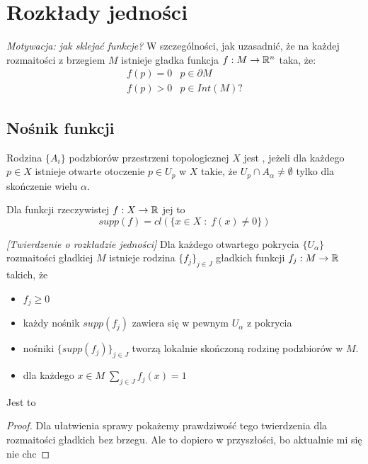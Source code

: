 \section{Rozkłady jedności}
\emph{Motywacja: jak sklejać funkcje?} W szczególności, jak uzasadnić, że na każdej rozmaitości z brzegiem $M$ istnieje gładka funkcja $f:M\to\mathbb{R}^n$ taka, że:
$$
\begin{matrix}
f(p)=0 & p\in\partial M\\
f(p)>0 & p\in Int(M)?
\end{matrix}
$$

\subsection{Nośnik funkcji}

\begin{definition}
Rodzina $\{A_i\}$ podzbiorów przestrzeni topologicznej $X$ jest , jeżeli dla każdego $p\in X$ istnieje otwarte otoczenie $p\in U_p$ w $X$ takie, że $U_p\cap A_\alpha\neq\emptyset$ tylko dla skończenie wielu $\alpha$.
\end{definition}

\begin{definition}
Dla funkcji rzeczywistej $f:X\to\mathbb{R}$ jej  to
$$supp(f)=cl(\{x\in X\;:\;f(x)\neq0\})$$
\end{definition}


\begin{theorem}
\emph{[Twierdzenie o rozkładzie jedności]} Dla każdego otwartego pokrycia $\{U_\alpha\}$ rozmaitości gładkiej $M$ istnieje rodzina $\{f_j\}_{j\in J}$ gładkich funkcji $f_j:M\to\mathbb{R}$ takich, że
\begin{itemize}
    \item $f_j\geq0$
    \item każdy nośnik $supp(f_j)$ zawiera się w pewnym $U_\alpha$ z pokrycia
    \item nośniki $\{supp(f_j)\}_{j\in J}$ tworzą lokalnie skończoną rodzinę podzbiorów w $M$.
    \item dla każdego $x\in M\;\sum\limits_{j\in J}f_j(x)=1$
\end{itemize}
Jest to 
\end{theorem}
\begin{proof}
Dla ułatwienia sprawy pokażemy prawdziwość tego twierdzenia dla rozmaitości gładkich bez brzegu. Ale to dopiero w przyszłości, bo aktualnie mi się nie chc
\end{proof}

